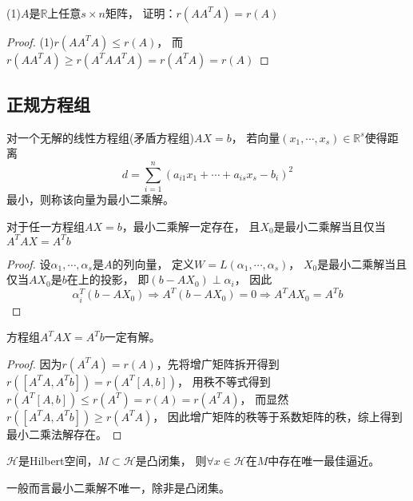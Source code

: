 ~

\begin{exercise}[$A^TA$与$A$性质]
  (1)$A$是$\mathbb{R}$上任意$s \times n$矩阵，
  证明：$r(AA^TA) = r(A)$
\end{exercise}

\begin{proof}
  (1)$r(AA^TA)\leq r(A)$，
  而$r(AA^TA) \geq r(A^TAA^TA) = r(A^TA) = r(A)$
\end{proof}



\subsection{正规方程组}


\begin{definition}[最小二乘解]
  对一个无解的线性方程组(矛盾方程组)$AX = b$，
  若向量$(x_1,\cdots,x_s) \in \mathbb{R}^s$使得距离
  \begin{equation*}
    d = \sum\limits_{i = 1}^n (a_{i1}x_1 + \cdots + a_{is}x_s - b_i)^2
  \end{equation*}
  最小，则称该向量为最小二乘解。
\end{definition}

\begin{theorem}[正规方程组]
  对于任一方程组$AX = b$，最小二乘解一定存在，
  且$X_0$是最小二乘解当且仅当$A^TAX = A^Tb$
\end{theorem}

\begin{proof}
  设$\alpha_1,\cdots,\alpha_s$是$A$的列向量，
  定义$W = L(\alpha_1,\cdots,\alpha_s)$，
  $X_0$是最小二乘解当且仅当$AX_0$是$b$在上的投影，
  即$(b - AX_0) \perp \alpha_i$，
  因此
  \begin{equation*}
    \alpha_i^T(b - AX_0) \Rightarrow A^T(b - AX_0) = 0  \Rightarrow A^TAX_0 = A^Tb
  \end{equation*}
\end{proof}


\begin{theorem}[正规方程组解的存在性]
  方程组$A^TAX = A^Tb$一定有解。
\end{theorem}

\begin{proof}
  因为$r(A^TA) = r(A)$，先将增广矩阵拆开得到$r([A^TA,A^Tb]) = r(A^T[A,b])$，
  用秩不等式得到$r(A^T[A,b]) \leq r(A^T) = r(A) = r(A^TA)$，
  而显然$r([A^TA,A^Tb]) \geq r(A^TA)$，
  因此增广矩阵的秩等于系数矩阵的秩，综上得到最小二乘法解存在。
\end{proof}

\begin{theorem}[凸闭集最佳逼近元的唯一性]
  $\mathcal{H}$是Hilbert空间，$M \subset \mathcal{H}$是凸闭集，
  则$\forall x \in \mathcal{H}$在$M$中存在唯一最佳逼近。
\end{theorem}

\begin{note}
  一般而言最小二乘解不唯一，除非是凸闭集。
\end{note}


